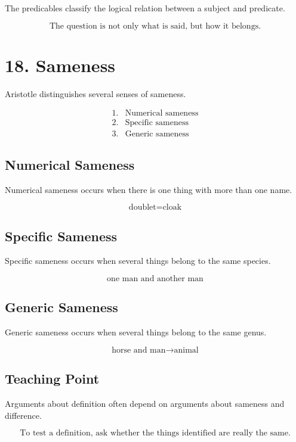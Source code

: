 \documentclass[12pt]{article}
\begin{document}
The predicables classify the logical relation between a subject and predicate.

\[
\boxed{
\text{The question is not only what is said, but how it belongs.}
}
\]

\section*{18. Sameness}

Aristotle distinguishes several senses of sameness.

\[
\begin{array}{ll}
1. & \text{Numerical sameness} \\
2. & \text{Specific sameness} \\
3. & \text{Generic sameness}
\end{array}
\]

\subsection*{Numerical Sameness}

Numerical sameness occurs when there is one thing with more than one name.

\[
\text{doublet} = \text{cloak}
\]

\subsection*{Specific Sameness}

Specific sameness occurs when several things belong to the same species.

\[
\text{one man and another man}
\]

\subsection*{Generic Sameness}

Generic sameness occurs when several things belong to the same genus.

\[
\text{horse and man} \rightarrow \text{animal}
\]

\subsection*{Teaching Point}

Arguments about definition often depend on arguments about sameness and
difference.

\[
\boxed{
\text{To test a definition, ask whether the things identified are really the same.}
}
\]
\end{document}
